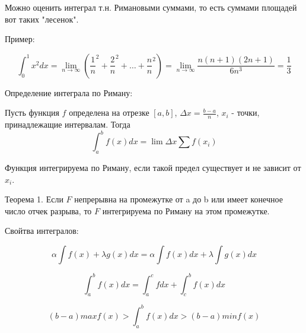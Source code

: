 \documentclass{article}
\begin{document}
Можно оценить интеграл т.н. Римановыми суммами, то есть суммами площадей вот таких "лесенок".

Пример:

$$\int _0^1x^2dx = \lim_{n\to\infty}(\frac 1n^2 + \frac 2n ^2 + \ldots + \frac nn^2)=\lim _{n\to\infty}\frac{n(n+1)(2n+1)}{6n^3} = \frac 13$$

Определение интеграла по Риману: 

Пусть функция $f$ определена на отрезке $[a,b]$, $\Delta x = \frac{b-a}n$, $x_i$ - точки, принадлежащие интервалам. Тогда
$$\int _a^b f(x)dx = \lim \Delta x \sum f(x_i)$$

Функция интегрируема по Риману, если такой предел существует и не зависит от $x_i$.

Теорема 1. Если $F$ непрерывна на промежутке от a до b или имеет конечное число отчек разрыва, то $F$ интегрируема по Риману на этом промежутке.

Свойтва интегралов:

$$\alpha \int f(x) + \lambda g(x)dx = \alpha\int f(x)dx + \lambda\int g(x)dx$$

$$\int _a^b f(x)dx = \int _a^cfdx + \int _c^b f(x)dx$$

$$(b-a)max f(x) >\int_a^b f(x)dx>(b-a)min f(x)$$
\end{document}

